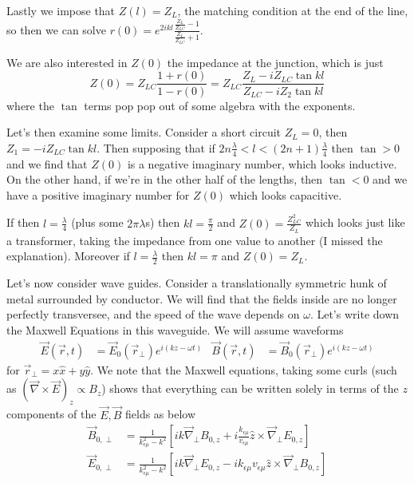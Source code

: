 \documentclass[10pt]{report}
\begin{document}
Lastly we impose that $Z(l) = Z_L$, the matching condition at the end of the line, so then we can solve $r(0) = e^{2ikl}\frac{\frac{Z_L}{Z_{LC}} - 1}{\frac{Z_L}{Z_{LC}} + 1}$.

We are also interested in $Z(0)$ the impedance at the junction, which is just 
\begin{equation}
    Z(0) = Z_{LC}\frac{1 + r(0)}{1 - r(0)} = Z_{LC}\frac{Z_L - iZ_{LC}\tan kl}{Z_{LC} - iZ_2\tan kl}
\end{equation}
where the $\tan$ terms pop pop out of some algebra with the exponents.

Let's then examine some limits. Consider a short circuit $Z_L = 0$, then $Z_1 = -iZ_{LC}\tan kl$. Then supposing that if $2n\frac{\lambda}{4} < l < (2n+1)\frac{\lambda}{4}$ then $\tan > 0$ and we find that $Z(0)$ is a negative imaginary number, which looks inductive. On the other hand, if we're in the other half of the lengths, then $\tan < 0$ and we have a positive imaginary number for $Z(0)$ which looks capacitive.

If then $l = \frac{\lambda}{4}$ (plus some $2\pi\lambda$s) then $kl = \frac{\pi}{2}$ and $Z(0) = \frac{Z_{LC}^2}{Z_L}$ which looks just like a transformer, taking the impedance from one value to another (I missed the explanation). Moreover if $l = \frac{\lambda}{2}$ then $kl=\pi$ and $Z(0) = Z_L$. 

Let's now consider wave guides. Consider a translationally symmetric hunk of metal surrounded by conductor. We will find that the fields inside are no longer perfectly transversee, and the speed of the wave depends on $\omega$. Let's write down the Maxwell Equations in this waveguide. We will assume waveforms
\begin{align}
    \vec{E}(\vec{r},t) &= \vec{E}_0(\vec{r}_{\perp}) e^{i(kz - \omega t)} & \vec{B}(\vec{r},t) &= \vec{B}_0(\vec{r}_{\perp}) e^{i(kz - \omega t)}
\end{align}
for $\vec{r}_{\perp} = x\hat{x} + y\hat{y}$. We note that the Maxwell equations, taking some curls (such as $(\vec{\nabla}\times \vec{E})_z \propto B_z$) shows that everything can be written solely in terms of the $z$ components of the $\vec{E}, \vec{B}$ fields as below
\begin{align}
    \vec{B}_{0,\perp} &= \frac{1}{k_{\epsilon \mu}^2 - k^2}\left[ ik\vec{\nabla}_{\perp}B_{0,z} + i\frac{k_{\epsilon\mu}}{v_{\epsilon \mu}}\hat{z}\times \vec{\nabla}_{\perp}E_{0,z} \right]\\
    \vec{E}_{0,\perp} &= \frac{1}{k_{\epsilon \mu}^2 - k^2}\left[ ik\vec{\nabla}_{\perp}E_{0,z} - ik_{\epsilon\mu}v_{\epsilon \mu}\hat{z}\times \vec{\nabla}_{\perp}B_{0,z} \right]
\end{align}
\end{document}
